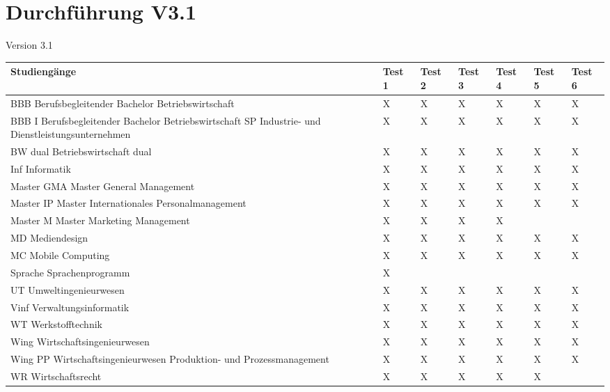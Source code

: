 \section{Durchführung V3.1}
Version 3.1\newline
\noindent%
\begin{tabularx}{\textwidth}{|p{}|X|X|X|X|X|X| }
\hline
\textbf{Studiengänge} &\textbf{Test 1} &\textbf{Test 2} &\textbf{Test 3}&\textbf{Test 4} &\textbf{Test 5} &\textbf{Test 6}  \\ \hline 

BBB  Berufsbegleitender Bachelor Betriebswirtschaft & X & X & X & X & X & X  \\ \hline
BBB I  Berufsbegleitender Bachelor Betriebswirtschaft SP Industrie- und Dienstleistungsunternehmen & X & X & X & X & X & X  \\ \hline
BW dual  Betriebswirtschaft dual & X & X & X & X & X & X  \\ \hline
Inf  Informatik & X & X & X & X & X & X  \\ \hline
Master GMA  Master General Management & X & X & X & X & X & X  \\ \hline
Master IP  Master Internationales Personalmanagement & X & X & X & X & X & X  \\ \hline
Master M  Master Marketing Management & X & X & X & X &  &   \\ \hline
MD  Mediendesign & X & X & X & X & X & X  \\ \hline
MC  Mobile Computing & X & X & X & X & X & X  \\ \hline
Sprache  Sprachenprogramm & X &  &  &  &  &   \\ \hline
UT  Umweltingenieurwesen & X & X & X & X & X & X  \\ \hline
Vinf  Verwaltungsinformatik & X & X & X & X & X & X  \\ \hline
WT  Werkstofftechnik & X & X & X & X & X & X  \\ \hline
Wing  Wirtschaftsingenieurwesen & X & X & X & X & X & X  \\ \hline
Wing PP Wirtschaftsingenieurwesen Produktion- und Prozessmanagement & X & X & X & X & X & X  \\ \hline
WR  Wirtschaftsrecht & X & X & X & X & X &   \\ \hline
\end{tabularx}
 \newline
 \newline

